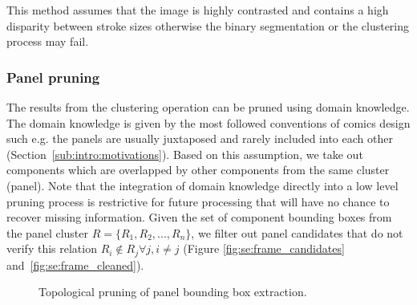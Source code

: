 This method assumes that the image is highly contrasted and contains a high disparity between stroke sizes otherwise the binary segmentation or the clustering process may fail.

\subsubsection{Panel pruning} %
\label{par:se:pruning}

The results from the clustering operation can be pruned using domain knowledge.
The domain knowledge is given by the most followed conventions of comics design such e.g. the panels are usually juxtaposed and rarely included into each other (Section~\ref{sub:intro:motivations}).
Based on this assumption, we take out components which are overlapped by other components from the same cluster (panel).
Note that the integration of domain knowledge directly into a low level pruning process is restrictive for future processing that will have no chance to recover missing information.
Given the set of component bounding boxes from the panel cluster $R = \{R_1, R_2, ... , R_n\}$, we filter out panel candidates that do not verify this relation $R_i\notin{R_j} \forall j, i \neq j$ (Figure \ref{fig:se:frame_candidates} and~\ref{fig:se:frame_cleaned}).

	\begin{figure}	%
	  \centering
			\hspace{2em}
		  \caption[Topological pruning of panel bounding box extraction]{Topological pruning of panel bounding box extraction.}
	\end{figure}


